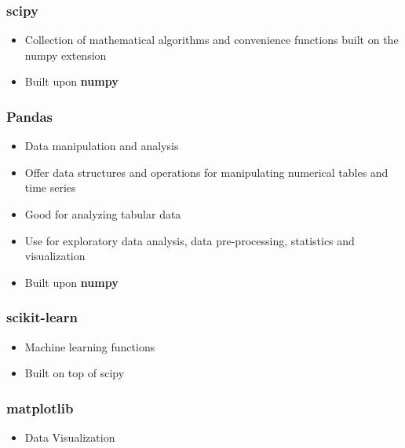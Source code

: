 \documentclass[
]{book}
\providecommand{\tightlist}{%
  \setlength{\itemsep}{0pt}\setlength{\parskip}{0pt}}
\begin{document}
\hypertarget{scipy}{%
\subsubsection{scipy}\label{scipy}}

\begin{itemize}
\tightlist
\item
  Collection of mathematical algorithms and convenience functions built on the numpy extension\\
\item
  Built upon \textbf{numpy}
\end{itemize}

\hypertarget{pandas}{%
\subsubsection{Pandas}\label{pandas}}

\begin{itemize}
\tightlist
\item
  Data manipulation and analysis
\item
  Offer data structures and operations for manipulating numerical tables and time series\\
\item
  Good for analyzing tabular data\\
\item
  Use for exploratory data analysis, data pre-processing, statistics and visualization
\item
  Built upon \textbf{numpy}
\end{itemize}

\hypertarget{scikit-learn}{%
\subsubsection{scikit-learn}\label{scikit-learn}}

\begin{itemize}
\tightlist
\item
  Machine learning functions\\
\item
  Built on top of scipy
\end{itemize}

\hypertarget{matplotlib}{%
\subsubsection{matplotlib}\label{matplotlib}}

\begin{itemize}
\tightlist
\item
  Data Visualization
\end{itemize}
\end{document}
